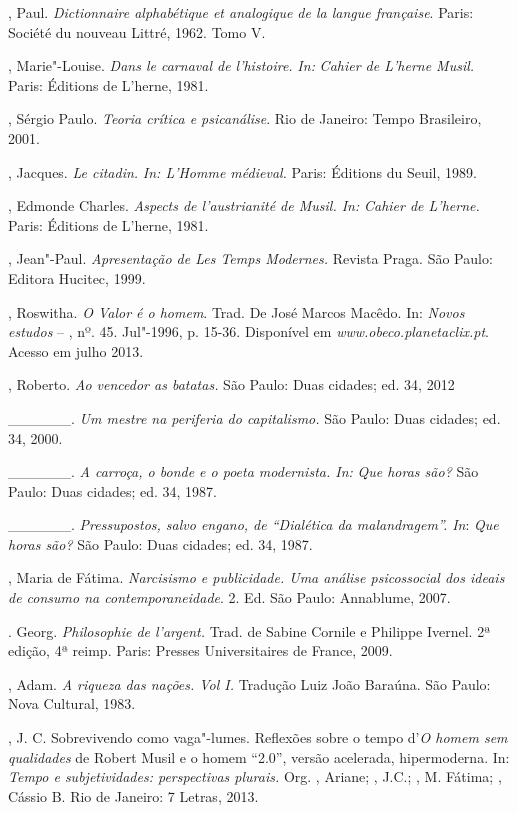{\begin{Parskip}
, Paul. \emph{Dictionnaire alphabétique et analogique de la
langue française}. Paris: Société du nouveau Littré, 1962. Tomo V.

, Marie"-Louise. \emph{Dans le carnaval de l'histoire.} \emph{In:}
\emph{Cahier de L'herne Musil.} Paris: Éditions de L'herne, 1981.

, Sérgio Paulo. \emph{Teoria crítica e psicanálise}. Rio de
Janeiro: Tempo Brasileiro, 2001.

, Jacques. \emph{Le citadin.} \emph{In: L'Homme médieval.}
Paris: Éditions du Seuil, 1989.

, Edmonde Charles. \emph{Aspects de l'austrianité de Musil. In:}
\emph{Cahier de L'herne.} Paris: Éditions de L'herne, 1981.

, Jean"-Paul. \emph{Apresentação de Les Temps Modernes.} Revista
Praga. São Paulo: Editora Hucitec, 1999.

, Roswitha. \emph{O Valor é o homem}. Trad. De José Marcos
Macêdo. In: \emph{Novos} \emph{estudos} -- , nº. 45. Jul"-1996, p.
15-36. Disponível em
\emph{www.obeco.planetaclix.pt}. Acesso em julho 2013.

, Roberto. \emph{Ao vencedor as batatas.} São Paulo: Duas
cidades; ed. 34, 2012

\_\_\_\_\_\_. \emph{Um mestre na periferia do capitalismo.} São Paulo:
Duas cidades; ed. 34, 2000.

\_\_\_\_\_\_. \emph{A carroça, o bonde e o poeta modernista. In:}
\emph{Que horas são?} São Paulo: Duas cidades; ed. 34, 1987.

\_\_\_\_\_\_. \emph{Pressupostos, salvo engano, de ``Dialética da
malandragem''. In}: \emph{Que horas são?} São Paulo: Duas cidades; ed.
34, 1987.

, Maria de Fátima. \emph{Narcisismo e publicidade. Uma
análise psicossocial dos ideais de consumo na contemporaneidade}. 2. Ed.
São Paulo: Annablume, 2007.

. Georg. \emph{Philosophie de l'argent.} Trad. de Sabine Cornile
e Philippe Ivernel. 2ª edição, 4ª reimp. Paris: Presses Universitaires
de France, 2009.

, Adam. \emph{A riqueza das nações. Vol I.} Tradução Luiz João
Baraúna. São Paulo: Nova Cultural, 1983.

, J. C. Sobrevivendo como vaga"-lumes. Reflexões sobre o tempo
d'\emph{O homem sem qualidades} de Robert Musil e o homem ``2.0'',
versão acelerada, hipermoderna. In: \emph{Tempo e subjetividades:
perspectivas plurais.} Org. , Ariane; , J.C.; , M.
Fátima; , Cássio B. Rio de Janeiro: 7 Letras, 2013.


\end{Parskip}}
